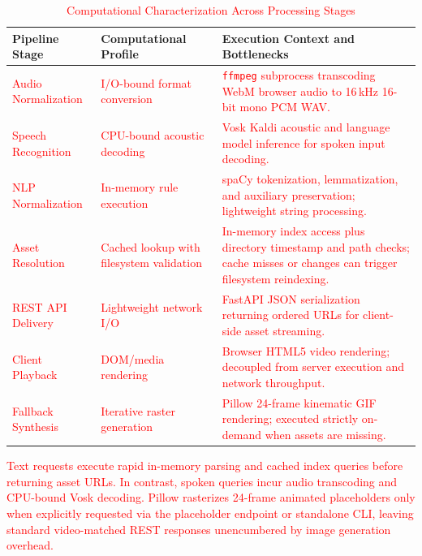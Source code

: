 \documentclass[conference,a4paper,10pt]{IEEEtran}
\begin{document}
\begin{table}[t]
\centering
\caption{\textcolor{red}{Computational Characterization Across Processing Stages}}
\label{tab:latency}
\begin{tabularx}{\columnwidth}{@{}l >{\raggedright\arraybackslash}p{2.1cm} >{\raggedright\arraybackslash}X@{}}
\toprule
\textbf{Pipeline Stage} & \textbf{Computational Profile} & \textbf{Execution Context and Bottlenecks} \\
\midrule
\textcolor{red}{Audio Normalization} & \textcolor{red}{I/O-bound format conversion} & \textcolor{red}{\texttt{ffmpeg} subprocess transcoding WebM browser audio to 16\,kHz 16-bit mono PCM WAV.} \\
\textcolor{red}{Speech Recognition} & \textcolor{red}{CPU-bound acoustic decoding} & \textcolor{red}{Vosk Kaldi acoustic and language model inference for spoken input decoding.} \\
\textcolor{red}{NLP Normalization} & \textcolor{red}{In-memory rule execution} & \textcolor{red}{spaCy tokenization, lemmatization, and auxiliary preservation; lightweight string processing.} \\
\textcolor{red}{Asset Resolution} & \textcolor{red}{Cached lookup with filesystem validation} & \textcolor{red}{In-memory index access plus directory timestamp and path checks; cache misses or changes can trigger filesystem reindexing.} \\
\textcolor{red}{REST API Delivery} & \textcolor{red}{Lightweight network I/O} & \textcolor{red}{FastAPI JSON serialization returning ordered URLs for client-side asset streaming.} \\
\textcolor{red}{Client Playback} & \textcolor{red}{DOM/media rendering} & \textcolor{red}{Browser HTML5 video rendering; decoupled from server execution and network throughput.} \\
\textcolor{red}{Fallback Synthesis} & \textcolor{red}{Iterative raster generation} & \textcolor{red}{Pillow 24-frame kinematic GIF rendering; executed strictly on-demand when assets are missing.} \\
\bottomrule
\end{tabularx}
\end{table}

\textcolor{red}{Text requests execute rapid in-memory parsing and cached index queries before returning asset URLs. In contrast, spoken queries incur audio transcoding and CPU-bound Vosk decoding. Pillow rasterizes 24-frame animated placeholders only when explicitly requested via the placeholder endpoint or standalone CLI, leaving standard video-matched REST responses unencumbered by image generation overhead.}
\end{document}
